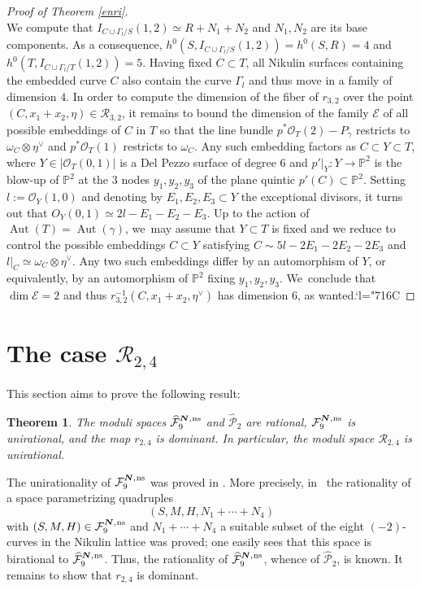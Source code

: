 \documentclass[11pt]{article}
\newcommand{\Changelback}{\mathcode`l="716C}
\newcommand{\ns}{{\mkern1mu\mathrm{ns}}}
\newcommand{\bN}{\boldsymbol{N}}
\theoremstyle{plain}
\newtheorem{thm}{Theorem}[section]
\theoremstyle{definition}
\DeclareMathOperator{\Aut}{Aut}
\newcommand\PP{{\mathbb P}}
\newcommand\E{{\mathcal E}}
\newcommand\F{{\mathcal F}}
\renewcommand\O{{\mathcal O}}
\renewcommand\P{{\mathcal P}}
\newcommand\R{{\mathcal R}}
\begin{document}
\begin{proof}[Proof of Theorem \ref{enri}]
\[\]
We compute that $I_{C\cup \Gamma_l/S}(1,2)\simeq R+N_1+N_2$ and $N_1,N_2$ are its base components. As a consequence, $h^0(S, I_{C\cup \Gamma_l/S}(1,2))=h^0(S,R)=4$ and $h^0(T, I_{C\cup \Gamma_l/T}(1,2))=5$. Having fixed $C\subset T$, all Nikulin surfaces containing the embedded curve $C$ also contain the curve $\Gamma_l$ and thus move in a family of dimension $4$. In order to compute the dimension of the fiber of $r_{3,2}$ over the point $(C,x_1+x_2,\eta)\in \R_{3,2}$, it remains to bound the dimension of the family $\E$ of all possible embeddings of $C$ in $T$ so that the line bundle $p^*\O_T(2)-P_\gamma$ restricts to $\omega_C\otimes \eta^\vee$ and $p^*\O_T(1)$ restricts to $\omega_C$. Any such embedding factors as $C\subset Y\subset T$, where $Y\in |\O_T(0,1)|$ is a Del Pezzo surface of degree $6$ and $p'|_Y:Y\to \PP^2$ is the blow-up of $\PP^2$ at the $3$ nodes $y_1,y_2,y_3$ of the plane quintic $p'(C)\subset \PP^2$. Setting $l:=\O_Y(1,0)$ and denoting by $E_1,E_2,E_3\subset Y$ the exceptional divisors, it turns out that $O_Y(0,1)\simeq 2l-E_1-E_2-E_3$. Up to the action of $\Aut(T)=\Aut(\gamma)$, we~may assume that $Y\subset T$ is fixed and we reduce to control the possible embeddings $C\subset Y$ satisfying $C\sim 5l-2E_1-2E_2-2E_3$ and $l|_C\simeq \omega_C\otimes \eta^\vee$. Any two such embeddings differ by an automorphism of $Y$, or equivalently, by an automorphism of $\PP^2$ fixing $y_1,y_2,y_3$. We~conclude that $\dim \E=2$ and thus $r_{3,2}^{-1}(C,x_1+x_2,\eta^\vee) $ has dimension $6$, as wanted.\Changelback
\end{proof}

\section{The case \texorpdfstring{$\R_{2,4}$}{R}}

This section aims to prove the following result:

\begin{thm}\label{giorgio}
The moduli spaces $\widehat{\F}_{9}^{\bN,\ns}$ and $\widehat\P_{2}$ are rational,
$\F_{9}^{\bN,\ns}$ is unirational, and
the map $r_{2,4}$ is dominant. In particular, the moduli space $\R_{2,4}$ is unirational.
\end{thm}

The unirationality of $\F_{9}^{\bN,\ns}$ was proved in \cite[Th.\,1.2]{KLV2}. More precisely, in~\cite[Th.\,4.5]{KLV2} the rationality of a space parametrizing quadruples\vspace*{-3pt}\enlargethispage{.5\baselineskip}
\[
(S,M,H,N_1+\cdots +N_4)
\]
with $(S,M,H) \in \F_{9}^{\bN,\ns}$ and $N_1+\cdots+N_4$ a suitable subset of the eight $(-2)$-curves in the Nikulin lattice was proved; one easily sees that this space is birational to $\widehat{\F}_{9}^{\bN,\ns}$. Thus, the rationality of
$\widehat{\F}_{9}^{\bN,\ns}$, whence of $\widehat\P_{2}$, is known. It remains to show that $r_{2,4}$ is dominant.
\end{document}
